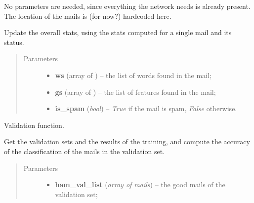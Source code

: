 \documentclass[letterpaper,10pt,english]{sphinxmanual}
\begin{document}
\begin{fulllineitems}
\begin{fulllineitems}
No parameters are needed, since everything the network needs is already
present. The location of the mails is (for now?) hardcoded here.

\end{fulllineitems}


\begin{fulllineitems}
\label{index:naive_bayes.Bayes.update_stats}
Update the overall stats, using the stats computed for a single mail
and its status.
\begin{quote}\begin{description}
\item[{Parameters}] \leavevmode\begin{itemize}
\item {} 
\textbf{ws} (array of {\hyperref[index:test_stat.Test_word]{}}) -- the list of words found in the mail;

\item {} 
\textbf{gs} (array of {\hyperref[index:test_stat.Test_stat]{}}) -- the list of features found in the mail;

\item {} 
\textbf{is\_spam} (\emph{bool}) -- \emph{True} if the mail is spam, \emph{False} otherwise.

\end{itemize}

\end{description}\end{quote}

\end{fulllineitems}


\begin{fulllineitems}
\label{index:naive_bayes.Bayes.validate}
Validation function.

Get the validation sets and the results of the training, and
compute the accuracy of the classification of the mails
in the validation set.
\begin{quote}\begin{description}
\item[{Parameters}] \leavevmode\begin{itemize}
\item {} 
\textbf{ham\_val\_list} (\emph{array of mails}) -- the good mails of the validation set;


\end{itemize}
\end{description}
\end{quote}
\end{fulllineitems}
\end{fulllineitems}
\end{document}
